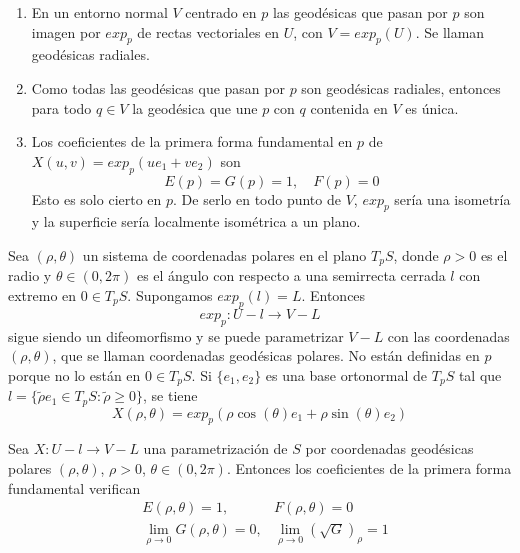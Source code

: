 \begin{properties}
    \hfill
    \begin{enumerate}
        \item En un entorno normal $V$ centrado en $p$ las geodésicas que pasan por $p$ son imagen por $exp_p$ de rectas vectoriales en $U$, con $V = exp_p(U)$. Se llaman geodésicas radiales.
        \item Como todas las geodésicas que pasan por $p$ son geodésicas radiales, entonces para todo $q \in V$ la geodésica que une $p$ con $q$ contenida en $V$ es única.
        \item Los coeficientes de la primera forma fundamental en $p$ de $X(u, v) = exp_p(ue_1 + ve_2)$ son $$E(p) = G(p) = 1, \quad F(p) = 0$$
              Esto es solo cierto en $p$. De serlo en todo punto de $V$, $exp_p$ sería una isometría y la superficie sería localmente isométrica a un plano.
    \end{enumerate}
\end{properties}

\begin{definition}
    Sea $(\rho, \theta)$ un sistema de coordenadas polares en el plano $T_pS$, donde $\rho>0$ es el radio y $\theta \in (0, 2\pi)$ es el ángulo con respecto a una semirrecta cerrada $l$ con extremo en $0 \in T_pS$.
    Supongamos $exp_p(l) = L$. Entonces $$exp_p : U-l \to V-L$$ sigue siendo un difeomorfismo y se puede parametrizar $V-L$ con las coordenadas $(\rho, \theta)$, que se llaman coordenadas geodésicas polares.
    No están definidas en $p$ porque no lo están en $0 \in T_pS$.
    Si $\{e_1, e_2\}$ es una base ortonormal de $T_pS$ tal que $l = \{ \tilde{\rho}e_1 \in T_pS : \tilde{\rho} \geq 0 \}$, se tiene $$X(\rho, \theta) = exp_p(\rho \cos(\theta)e_1 + \rho \sin(\theta)e_2)$$
\end{definition}

\begin{proposition}
    Sea $X: U-l \to V-L$ una parametrización de $S$ por coordenadas geodésicas polares $(\rho, \theta)$, $\rho>0$, $\theta \in (0, 2\pi)$.
    Entonces los coeficientes de la primera forma fundamental verifican
    \begin{align*}
         & E(\rho, \theta) = 1,                          & F(\rho, \theta) = 0                          \\
         & \lim\limits_{\rho \to 0} G(\rho, \theta) = 0, & \lim\limits_{\rho \to 0} (\sqrt{G})_\rho = 1
    \end{align*}
\end{proposition}

